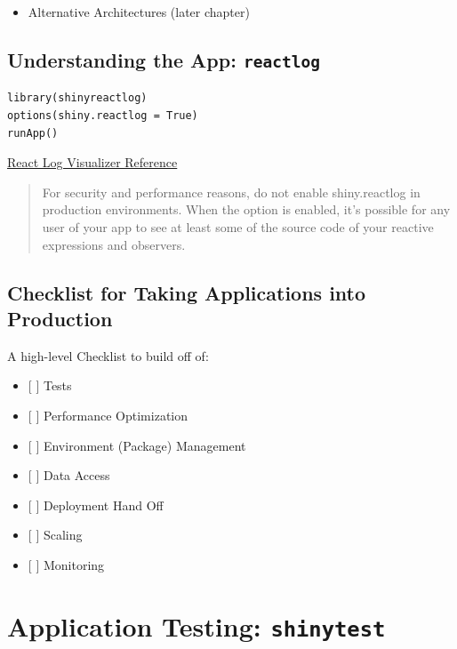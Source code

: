 \documentclass[]{book}
\providecommand{\tightlist}{%
  \setlength{\itemsep}{0pt}\setlength{\parskip}{0pt}}
\theoremstyle{definition}
\theoremstyle{definition}
\theoremstyle{definition}
\theoremstyle{remark}
\begin{document}
\begin{itemize}
\tightlist
\item
  Alternative Architectures (later chapter)
\end{itemize}

\hypertarget{understanding-the-app-reactlog}{%
\section{\texorpdfstring{Understanding the App:
\texttt{reactlog}}{Understanding the App: reactlog}}\label{understanding-the-app-reactlog}}

\begin{verbatim}
library(shinyreactlog)
options(shiny.reactlog = True)
runApp()
\end{verbatim}

\href{https://shiny.rstudio.com/reference/shiny/0.14/showReactLog.html}{React
Log Visualizer Reference}

\begin{quote}
For security and performance reasons, do not enable shiny.reactlog in
production environments. When the option is enabled, it's possible for
any user of your app to see at least some of the source code of your
reactive expressions and observers.
\end{quote}

\hypertarget{checklist-for-taking-applications-into-production}{%
\section{Checklist for Taking Applications into
Production}\label{checklist-for-taking-applications-into-production}}

A high-level Checklist to build off of:

\begin{itemize}
\tightlist
\item
  {[} {]} Tests
\item
  {[} {]} Performance Optimization
\item
  {[} {]} Environment (Package) Management
\item
  {[} {]} Data Access
\item
  {[} {]} Deployment Hand Off
\item
  {[} {]} Scaling
\item
  {[} {]} Monitoring
\end{itemize}

\hypertarget{application-testing-shinytest}{%
\chapter{\texorpdfstring{Application Testing:
\texttt{shinytest}}{Application Testing: shinytest}}\label{application-testing-shinytest}}
\end{document}
